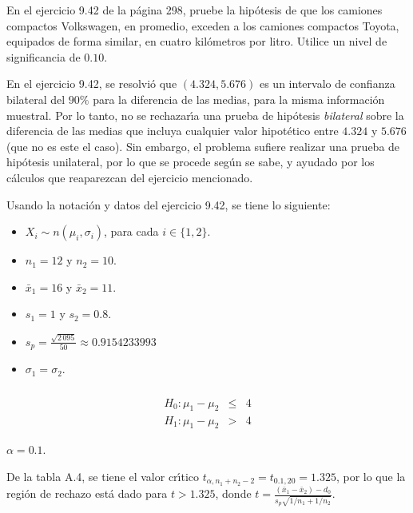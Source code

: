 \begin{enunciado}
 En el ejercicio 9.42 de la p\'agina 298, pruebe la hip\'otesis de que los camiones compactos Volkswagen, en promedio, exceden a los camiones compactos Toyota, equipados de forma similar, en cuatro kil\'ometros por litro. Utilice un nivel de significancia de $0.10$.
\end{enunciado}

\begin{solucion}
 En el ejercicio 9.42, se resolvi\'o
 que $(4.324, 5.676)$ es un intervalo de confianza bilateral
 del $90\%$ para la diferencia de las medias,
 para la misma informaci\'on muestral.
 Por lo tanto, no se rechazar\'{\i}a una prueba de hip\'otesis
 \textit{bilateral} sobre la diferencia de las medias
 que incluya cualquier valor hipot\'etico entre $4.324$ y $5.676$
 (que no es este el caso).
 Sin embargo, el problema sufiere realizar una prueba de hip\'otesis
 unilateral, por lo que se procede seg\'un se sabe,
 y ayudado por los c\'alculos que reaparezcan del ejercicio mencionado.
 \begin{datos}
  Usando la notaci\'on y datos del ejercicio 9.42,
  se tiene lo siguiente:
  \begin{itemize}
   \item $X_i \sim n\left( \mu_i, \sigma_i \right)$,
   para cada $i \in \{ 1, 2 \}$.
   \item $n_1 = 12$ y $n_2 = 10$.
   \item $\bar{x}_1 = 16$ y $\bar{x}_2 = 11$.
   \item $s_1 = 1$ y $s_2 = 0.8$.
   \item $s_p = \frac{\sqrt{2\,095}}{50} \approx 0.9154233993$
   \item $\sigma_1 = \sigma_2$.
  \end{itemize}
 \end{datos}
 
 \begin{hipotesis}
  $\phantom{0}$
  \begin{eqnarray*}
   H_0: \mu_1 - \mu_2 & \leq & 4 \\
   H_1: \mu_1 - \mu_2 & > & 4
  \end{eqnarray*}
 \end{hipotesis}

 \begin{significancia}
  $\alpha = 0.1$.
 \end{significancia}

 \begin{region}
  De la tabla A.4, se tiene el valor cr\'{\i}tico
  $t_{\alpha,n_1+n_2-2} = t_{0.1,20} = 1.325$,
  por lo que la regi\'on de rechazo est\'a dado para $t > 1.325$,
  donde $t = 
  \frac{
  \left( \bar{x}_1 - \bar{x}_2 \right) - d_0
  }{
  s_p\sqrt{1/n_1 + 1/n_2}
  }$.
 \end{region}


\end{solucion}
